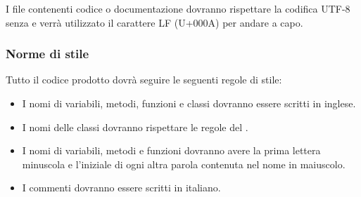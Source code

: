 I file contenenti codice o documentazione dovranno rispettare la codifica UTF-8 senza  e verrà utilizzato il carattere LF (U+000A) per andare a capo.

\subsubsection{Norme di stile}
Tutto il codice prodotto dovrà seguire le seguenti regole di stile:
\begin{itemize}
	\item I nomi di variabili, metodi, funzioni e classi dovranno essere scritti in inglese.
	\item I nomi delle classi dovranno rispettare le regole del .
	\item I nomi di variabili, metodi e funzioni dovranno avere la prima lettera minuscola e l'iniziale di ogni altra parola contenuta nel nome in maiuscolo.
	\item I commenti dovranno essere scritti in italiano.
\end{itemize}